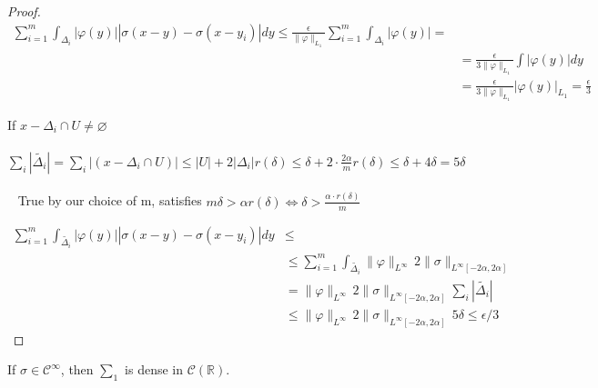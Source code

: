 \documentclass[../main.tex]{subfiles}
\begin{document}
\begin{proof}
		
		\begin{equation*}
			\begin{split}
				\sum_{i=1}^m  \int_{\Delta_i} \left| \varphi(y)\right| \left| \sigma(x-y)-\sigma(x-y_i)\right|dy  \leq  \frac{\epsilon}{\| \varphi\|_{L_1}}  \sum_{i=1}^m  \int_{\Delta_i} \left| \varphi(y)\right| = & \\
				& =  \frac{\epsilon}{3\| \varphi\|_{L_1}} \int \left|\varphi(y)\right| dy \\
				& =  \frac{\epsilon}{3\| \varphi\|_{L_1}} \left|\varphi(y)\right|_{L_1} = \frac{\epsilon}{3} 
			\end{split}
		\end{equation*}
		
		If $x-\Delta_i \cap U \neq \varnothing$\\ \\ 
		$\sum_i |\tilde{\Delta_i}| = \sum_i|(x-\Delta_i \cap U)| \leq |U|+2|\Delta_i| r(\delta) \leq \delta + 2 \cdot \frac{2\alpha}{m} r(\delta) \leq \delta +4\delta = 5\delta$  \\ \\ 
		True by our choice of m, satisfies $m\delta > \alpha r(\delta) \iff \delta > \frac{\alpha \cdot r(\delta)}{m}$
		
		
		\begin{equation*}
			\begin{split}
				\sum_{i=1}^m  \int_{\tilde{\Delta_i}} \left| \varphi(y)\right| \left| \sigma(x-y)-\sigma(x-y_i)\right|dy & \leq \\
				&  \leq  \sum_{i=1}^m  \int_{\tilde{\Delta_i}} \| \varphi\|_{L^{\infty}} \, 2 \| \sigma \|_{L^{\infty}[-2\alpha,2\alpha]} \\
				& = \| \varphi\|_{L^{\infty}} \, 2 \| \sigma \|_{L^{\infty}[-2\alpha,2\alpha]} \sum_i| \tilde{\Delta_i} | \\
				& \leq \| \varphi\|_{L^{\infty}} \, 2 \| \sigma \|_{L^{\infty}[-2\alpha,2\alpha]} \, 5 \delta \leq \epsilon /3
			\end{split}
		\end{equation*}
		
	\end{proof}
	
	\begin{lema} %
		If $\sigma \in \mathcal{C}^{\infty}$, then $ \sum_1$ is dense in  $\mathcal{C}(\mathbb{R})$.
	\end{lema}
	
\end{document}
